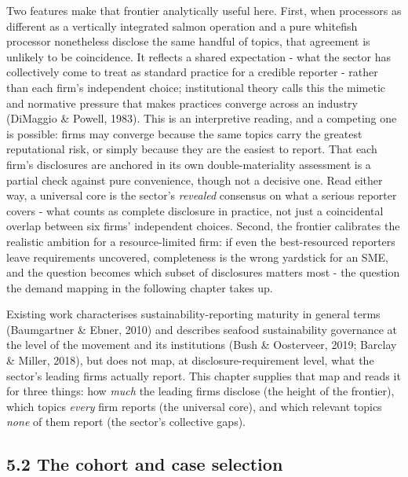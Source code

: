 Two features make that frontier analytically useful here. First, when processors
as different as a vertically integrated salmon operation and a pure whitefish
processor nonetheless disclose the same handful of topics, that agreement is
unlikely to be coincidence. It reflects a shared expectation - what the sector
has collectively come to treat as standard practice for a credible reporter -
rather than each firm's independent choice; institutional theory calls this the
mimetic and normative pressure that makes practices converge across an industry
(DiMaggio \& Powell, 1983). This is an interpretive reading, and a competing one
is possible: firms may converge because the same topics carry the greatest
reputational risk, or simply because they are the easiest to report. That each
firm's disclosures are anchored in its own double-materiality assessment is a
partial check against pure convenience, though not a decisive one. Read either
way, a universal core is the sector's \emph{revealed} consensus on what a serious
reporter covers - what counts as complete disclosure in practice, not just a
coincidental overlap between six firms' independent choices.
Second, the frontier calibrates the realistic ambition for a
resource-limited firm: if even the best-resourced reporters leave requirements
uncovered, completeness is the wrong yardstick for an SME, and the question
becomes which subset of disclosures matters most - the question the demand
mapping in the following chapter takes up.

Existing work characterises sustainability-reporting maturity in general terms
(Baumgartner \& Ebner, 2010) and describes seafood
sustainability governance at the level of the movement and its institutions (Bush
\& Oosterveer, 2019; Barclay \& Miller, 2018), but does not map, at
disclosure-requirement level, what the sector's leading firms actually report.
This chapter supplies that map and reads it for three things: how \emph{much} the
leading firms disclose (the height of the frontier), which topics \emph{every}
firm reports (the universal core), and which relevant topics \emph{none} of them
report (the sector's collective gaps).


\FloatBarrier
\subsection{5.2 The cohort and case selection}\label{cohort-selection}

